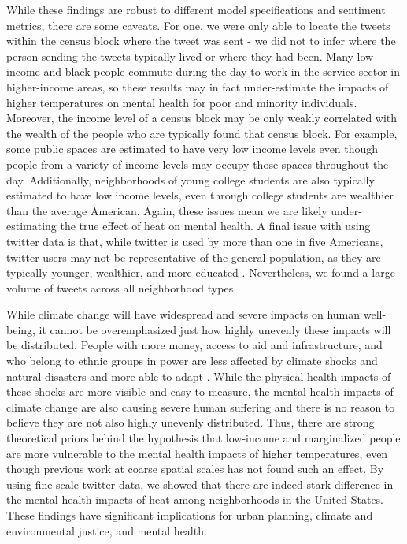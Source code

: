 \documentclass{article}
\begin{document}
While these findings are robust to different model specifications and sentiment metrics, there are some caveats.  For one, we were only able to locate the tweets within the census block where the tweet was sent - we did not to infer where the person sending the tweets typically lived or where they had been.  Many low-income and black people commute during the day to work in the service sector in higher-income areas, so these results may in fact under-estimate the impacts of higher temperatures on mental health for poor and minority individuals.  Moreover, the income level of a census block may be only weakly correlated with the wealth of the people who are typically found that census block.  For example, some public spaces are estimated to have very low income levels even though people from a variety of income levels may occupy those spaces throughout the day.  Additionally, neighborhoods of young college students are also typically estimated to have low income levels, even through college students are wealthier than the average American.  Again, these issues mean we are likely under-estimating the true effect of heat on mental health.  A final issue with using twitter data is that, while twitter is used by more than one in five Americans, twitter users may not be representative of the general population, as they are typically younger, wealthier, and more educated \cite{Pew2020Sep}.  Nevertheless, we found a large volume of tweets across all neighborhood types.

While climate change will have widespread and severe impacts on human well-being, it cannot be overemphasized just how highly unevenly these impacts will be distributed.  People with more money, access to aid and infrastructure, and who belong to ethnic groups in power are less affected by climate shocks and natural disasters and more able to adapt \cite{bullard2012wrong}.  While the physical health impacts of these shocks are more visible and easy to measure, the mental health impacts of climate change are also causing severe human suffering and there is no reason to believe they are not also highly unevenly distributed.  Thus, there are strong theoretical priors behind the hypothesis that low-income and marginalized people are more vulnerable to the mental health impacts of higher temperatures, even though previous work at coarse spatial scales has not found such an effect.  By using fine-scale twitter data, we showed that there are indeed stark difference in the mental health impacts of heat among neighborhoods in the United States.  These findings have significant implications for urban planning, climate and environmental justice, and mental health.
\end{document}
